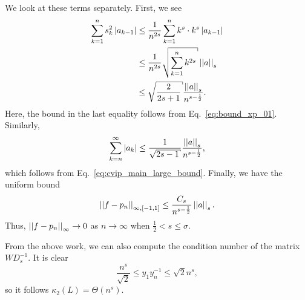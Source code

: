 We look at these terms separately. First, we see
%
\begin{align}
    \sum_{k=1}^{n}s_{k}^{2}\abs{a_{k-1}} &\le
        \frac{1}{n^{2s}} \sum_{k=1}^{n}k^{s}\cdot k^{s}\abs{a_{k-1}} \nonumber\\
    &\le \frac{1}{n^{2s}}\sqrt{\sum_{k=1}^{n} k^{2s}}\norm{a}_{s}
        \nonumber\\
    &\le \sqrt{\frac{2}{2s+1}}\frac{\norm{a}_{s}}{n^{s-\frac{1}{2}}}.
    \label{eq:cvip_interp_1D_sine_bound}
\end{align}
%
Here, the bound in the last equality follows from Eq.~\eqref{eq:bound_xp_01}.
Similarly,
%
\begin{equation}
    \sum_{k=n}^{\infty}\abs{a_{k}}
        \le \frac{1}{\sqrt{2s-1}}\frac{\norm{a}_{s}}{n^{s-\frac{1}{2}}},
    \label{eq:cvip_interp_1D_tail_bound}
\end{equation}
%
which follows from Eq.~\eqref{eq:cvip_main_large_bound}.
Finally, we have the uniform bound
%
\begin{equation}
    \left| \left| f-p_{n} \right| \right|_{\infty,[-1,1]}
        \le \frac{C_{s}}{n^{s-\frac{1}{2}}}\left| \left| a \right| \right|_{s}.
\end{equation}
%
Thus, $\left| \left| f-p_{n} \right| \right|_{\infty}\to0$ as $n\to\infty$
when $\frac{1}{2} < s \le \sigma$.



From the above work, we can also compute the condition number of
the matrix $WD_{s}^{-1}$. It is clear
%
\begin{equation}
    \frac{n^{s}}{\sqrt{2}}\le y_{1}y_{n}^{-1} \le \sqrt{2}n^{s},
\end{equation}
%
so it follows $\kappa_{2}(L) = \Theta(n^{s})$.



